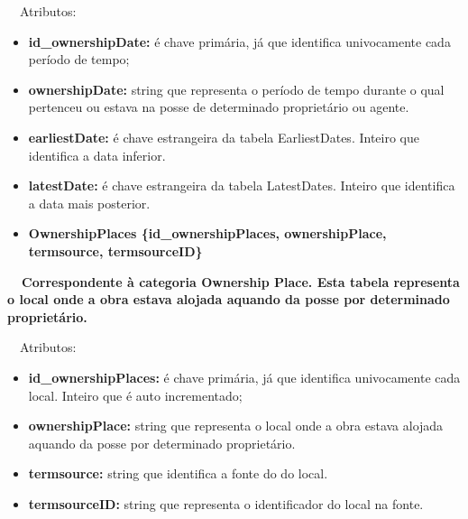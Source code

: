 \documentclass[letterpaper]{article}
\newcommand\textstyleStrongEmphasis[1]{\textbf{#1}}
\newcommand\liststyleLi{%
\renewcommand\labelitemi{{\textbullet}}
\renewcommand\labelitemii{[27A2?]}
\renewcommand\labelitemiii{{\textbullet}}
\renewcommand\labelitemiv{{\textbullet}}
}
\newcommand\liststyleLvi{%
\renewcommand\labelitemi{[27A2?]}
\renewcommand\labelitemii{[27A2?]}
\renewcommand\labelitemiii{[27A2?]}
\renewcommand\labelitemiv{[27A2?]}
}
\newcommand\liststyleLxiv{%
\renewcommand\labelitemi{[27A2?]}
\renewcommand\labelitemii{[27A2?]}
\renewcommand\labelitemiii{[27A2?]}
\renewcommand\labelitemiv{[27A2?]}
}
\begin{document}
\bigskip

{
\ \ Atributos:}

\liststyleLvi
\begin{itemize}
\item {
\textbf{id\_}\textbf{ownershipDate}\textbf{:} \'e chave prim\'aria, j\'a
que identifica univocamente cada per\'iodo de tempo;}
\item {
\textbf{ownershipDate:} string que representa o per\'iodo de tempo
durante o qual pertenceu ou estava na posse de determinado
propriet\'ario ou agente.}
\item {
\textbf{earliestDate:} \'e chave estrangeira da tabela EarliestDates.
Inteiro que identifica a data inferior.}
\item {
\textbf{latestDate:} \'e chave estrangeira da tabela LatestDates.
Inteiro que identifica a data mais posterior.}
\end{itemize}

\bigskip

\liststyleLi
\begin{itemize}
\item {\bfseries
OwnershipPlaces\textmd{ \{}\textmd{id\_ownershipPlaces}\textmd{,
ownershipPlace, termsource, termsourceID\}}}
\end{itemize}
{\bfseries
\foreignlanguage{english}{\textmd{\ \ Correspondente \`a categoria
}}\foreignlanguage{english}{Owner}\textstyleStrongEmphasis{\foreignlanguage{english}{ship
Place}}\foreignlanguage{english}{\textmd{. Esta
}}\textstyleStrongEmphasis{\foreignlanguage{english}{\textmd{tabela}}}\foreignlanguage{english}{\textmd{
representa o local onde a obra estava alojada aquando da posse por
determinado propriet\'ario.}}}


\bigskip

{
\ \ Atributos:}

\liststyleLxiv
\begin{itemize}
\item {
\textbf{id\_ownershipPlaces: }\'e chave prim\'aria, j\'a que identifica
univocamente cada local. Inteiro que \'e auto incrementado;}
\item {
\textbf{ownershipPlace: }string que representa o local onde a obra
estava alojada aquando da posse por determinado propriet\'ario.}
\item {
\textbf{termsource: }string que identifica a fonte do do local.}
\item {
\textbf{termsourceID:} string que representa o identificador do local na
fonte.}
\end{itemize}
\end{document}
